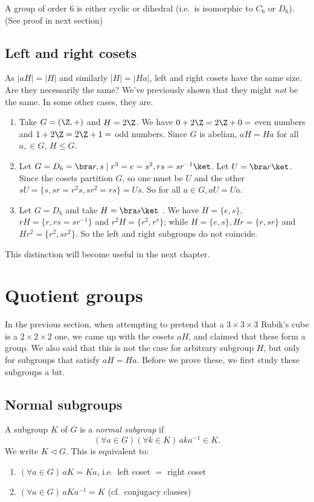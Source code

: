\documentclass[a4paper]{article}
\begin{document}
\begin{prop}
  A group of order $6$ is either cyclic or dihedral (i.e.\ is isomorphic to $C_6$ or $D_6$). (See proof in next section)
\end{prop}

\subsection{Left and right cosets}
As $|aH| = |H|$ and similarly $|H| = |Ha|$, left and right cosets have the same size. Are they necessarily the same? We've previously shown that they might \emph{not} be the same. In some other cases, they are.
\begin{eg}\leavevmode
  \begin{enumerate}
    \item Take $G = (\Z, +)$ and $H = 2\Z$. We have $0 + 2\Z = 2\Z + 0 = $ even numbers and $1 + 2\Z = 2\Z + 1 = $ odd numbers. Since $G$ is abelian, $aH = Ha$ for all $a, \in G$, $H\leq G$.
    \item Let $G = D_6 = \bra r, s \mid r^3 = e = s^2, rs = sr^{-1}\ket$. Let $U = \bra r\ket$. Since the cosets partition $G$, so one must be $U$ and the other $sU = \{s, sr = r^2s, sr^2 = rs\} = Us$. So for all $a\in G, aU = Ua$.
    \item Let $G = D_6$ and take $H = \bra s\ket$ . We have $H = \{e, s\}$, $rH = \{r, rs = sr^{-1}\}$ and $r^2 H = \{r^2, r^s\}$; while $H = \{e, s\}, Hr = \{r, sr\}$ and $Hr^2=\{r^2, sr^2\}$. So the left and right subgroups do not coincide.
  \end{enumerate}
\end{eg}
This distinction will become useful in the next chapter.

\section{Quotient groups}
In the previous section, when attempting to pretend that a $3\times 3\times 3$ Rubik's cube is a $2\times 2\times 2$ one, we came up with the cosets $aH$, and claimed that these form a group. We also said that this is not the case for arbitrary subgroup $H$, but only for subgroups that satisfy $aH = Ha$. Before we prove these, we first study these subgroups a bit.

\subsection{Normal subgroups}
\begin{defi}
  A subgroup $K$ of $G$ is a \emph{normal subgroup} if
  \[
    (\forall a\in G)(\forall k\in K)\,aka^{-1}\in K.
  \]
  We write $K\lhd G$. This is equivalent to:
  \begin{enumerate}
    \item $(\forall a\in G)\,aK = Ka$, i.e.\ left coset $=$ right coset
    \item $(\forall a\in G)\,aKa^{-1} = K$ (cf.\ conjugacy classes)
  \end{enumerate}
\end{defi}
\end{document}
